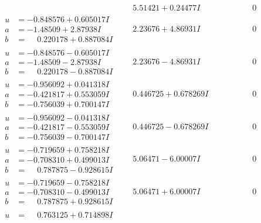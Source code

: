 \documentclass[1p]{elsarticle_modified}
\theoremstyle{definition}
\begin{document}
$$\begin{array}{c|c|c}
 & \phantom{-}5.51421 + 0.24477 I & \phantom{-0.000000 } 0 \\ \hline\begin{aligned}
u &= -0.848576 + 0.605017 I \\
a &= -1.48509 + 2.87938 I \\
b &= \phantom{-}0.220178 + 0.887084 I\end{aligned}
 & \phantom{-}2.23676 + 4.86931 I & \phantom{-0.000000 } 0 \\ \hline\begin{aligned}
u &= -0.848576 - 0.605017 I \\
a &= -1.48509 - 2.87938 I \\
b &= \phantom{-}0.220178 - 0.887084 I\end{aligned}
 & \phantom{-}2.23676 - 4.86931 I & \phantom{-0.000000 } 0 \\ \hline\begin{aligned}
u &= -0.956092 + 0.041318 I \\
a &= -0.421817 + 0.553059 I \\
b &= -0.756039 + 0.700147 I\end{aligned}
 & \phantom{-}0.446725 + 0.678269 I & \phantom{-0.000000 } 0 \\ \hline\begin{aligned}
u &= -0.956092 - 0.041318 I \\
a &= -0.421817 - 0.553059 I \\
b &= -0.756039 - 0.700147 I\end{aligned}
 & \phantom{-}0.446725 - 0.678269 I & \phantom{-0.000000 } 0 \\ \hline\begin{aligned}
u &= -0.719659 + 0.758218 I \\
a &= -0.708310 + 0.499013 I \\
b &= \phantom{-}0.787875 - 0.928615 I\end{aligned}
 & \phantom{-}5.06471 - 6.00007 I & \phantom{-0.000000 } 0 \\ \hline\begin{aligned}
u &= -0.719659 - 0.758218 I \\
a &= -0.708310 - 0.499013 I \\
b &= \phantom{-}0.787875 + 0.928615 I\end{aligned}
 & \phantom{-}5.06471 + 6.00007 I & \phantom{-0.000000 } 0 \\ \hline\begin{aligned}
u &= \phantom{-}0.763125 + 0.714898 I \\

\end{aligned}
\end{array}$$
\end{document}
